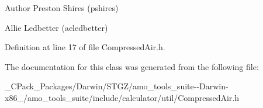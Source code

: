 \begin{DoxyAuthor}{Author}
Preston Shires (pshires) 

Allie Ledbetter (aeledbetter) 
\end{DoxyAuthor}


Definition at line 17 of file Compressed\+Air.\+h.



The documentation for this class was generated from the following file\+:\begin{DoxyCompactItemize}
\item 
\+\_\+\+C\+Pack\+\_\+\+Packages/\+Darwin/\+S\+T\+G\+Z/amo\+\_\+tools\+\_\+suite-\/-\/\+Darwin-\/x86\+\_/amo\+\_\+tools\+\_\+suite/include/calculator/util/Compressed\+Air.\+h\end{DoxyCompactItemize}
